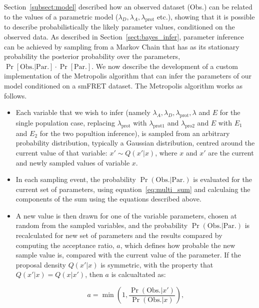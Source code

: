 Section~\ref{subsect:model} described how an observed dataset (Obs.) can be related to the values of a parametric model ($\lambda_D, \lambda_A, \lambda_{\text{prot}}$ etc.), showing that it is possible to describe probabilistically the likely parameter values, conditioned on the observed data. As described in Section~\ref{sect:bayes_infer}, parameter inference can be achieved by sampling from a Markov Chain that has as its stationary probability the posterior probability over the parameters, $\Pr[\text{Obs.} | \text{Par.}] \cdot \Pr[\text{Par.}]$. We now describe the development of a custom implementation of the Metropolis algorithm that can infer the parameters of our model conditioned on a smFRET dataset. The Metropolis algorithm works as follows.

\begin{itemize}
\item Each variable that we wish to infer (namely $\lambda_A, \lambda_D, \lambda_{\text{prot}}, \lambda$ and $E$ for the single population case, replacing $\lambda_{\text{prot}}$ with $\lambda_{\text{prot1}}$ and $\lambda_{\text{pro2}}$ and $E$ with $E_1$ and $E_2$ for the two popultion inference), is sampled from an arbitrary probability distribution, typically a Gaussian distribution, centred around the current value of that variable: $x' \sim Q(x'|x) $, where $x$ and $x'$ are the current and newly sampled values of variable $x$.

\item In each sampling event, the probability $\Pr(\text{Obs.} | \text{Par.})$ is evaluated for the current set of parameters, using equation~\ref{eq:multi_sum} and calculaing the components of the sum using the equations described above.  

\item A new value is then drawn for one of the variable parameters, chosen at random from the sampled variables, and the probability $\Pr(\text{Obs.} | \text{Par.})$ is recalculated for new set of parameters and the results compared by computing the acceptance ratio, $a$, which defines how probable the new sample value is, compared with the current value of the parameter. If the proposal density $Q(x'|x)$ is symmetric, with the property that $Q(x'|x) = Q(x|x')$, then $a$ is calcualtated as:

\begin{equation}
a = \min(1, \frac{\Pr(\text{Obs.} | x')}{\Pr(\text{Obs.} | x)}),
\end {equation}


\end{itemize}
